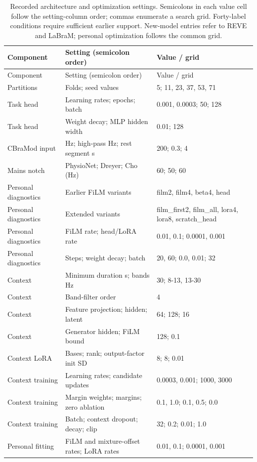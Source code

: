 \begin{longtable}{p{1.15in}p{2.7in}p{2.75in}}
\caption{Recorded architecture and optimization settings. Semicolons in each value cell follow the setting-column order; commas enumerate a search grid. Forty-label conditions require sufficient earlier support. New-model entries refer to REVE and LaBraM; personal optimization follows the common grid.}\label{tab:grids}\\
\toprule
Component & Setting (semicolon order) & Value / grid \\
\midrule
\endfirsthead
\toprule
Component & Setting (semicolon order) & Value / grid \\
\midrule
\endhead
Partitions & Folds; seed values & 5; 11, 23, 37, 53, 71 \\
Task head & Learning rates; epochs; batch & 0.001, 0.0003; 50; 128 \\
Task head & Weight decay; MLP hidden width & 0.01; 128 \\
CBraMod input & Hz; high-pass Hz; rest segment s & 200; 0.3; 4 \\
Mains notch & PhysioNet; Dreyer; Cho (Hz) & 60; 50; 60 \\
Personal diagnostics & Earlier FiLM variants & film2, film4, beta4, head \\
Personal diagnostics & Extended variants & film\_\allowbreak{}first2, film\_\allowbreak{}all, lora4, lora8, scratch\_\allowbreak{}head \\
Personal diagnostics & FiLM rate; head/LoRA rate & 0.01, 0.1; 0.0001, 0.001 \\
Personal diagnostics & Steps; weight decay; batch & 20, 60; 0.0, 0.01; 32 \\
Context & Minimum duration s; bands Hz & 30; 8-13, 13-30 \\
Context & Band-filter order & 4 \\
Context & Feature projection; hidden; latent & 64; 128; 16 \\
Context & Generator hidden; FiLM bound & 128; 0.1 \\
Context LoRA & Bases; rank; output-factor init SD & 8; 8; 0.01 \\
Context training & Learning rates; candidate updates & 0.0003, 0.001; 1000, 3000 \\
Context training & Margin weights; margins; zero ablation & 0.1, 1.0; 0.1, 0.5; 0.0 \\
Context training & Batch; context dropout; decay; clip & 32; 0.2; 0.01; 1.0 \\
Personal fitting & FiLM and mixture-offset rates; LoRA rates & 0.01, 0.1; 0.0001, 0.001 \\

\end{longtable}
